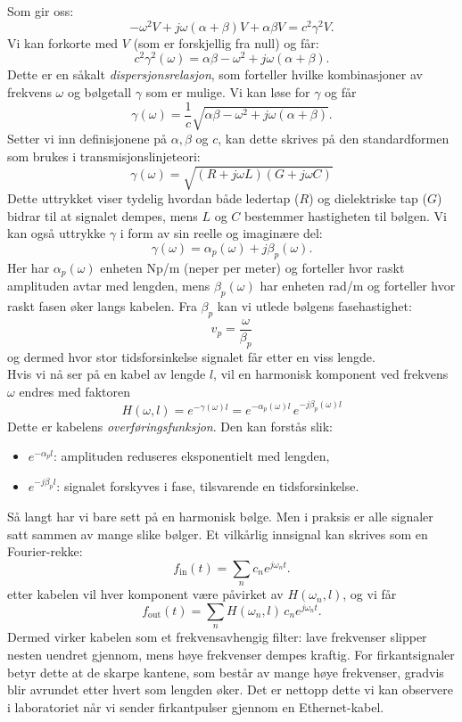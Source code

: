 Som gir oss:
\[    
-\omega^2 V + j\omega(\alpha+\beta)V + \alpha \beta V = c^2 \gamma^2 V.
\]
Vi kan forkorte med $V$ (som er forskjellig fra null) og får:
\[
c^2 \gamma^2(\omega) = \alpha \beta - \omega^2 + j\omega(\alpha+\beta).
\]
\clearpage
\noindent Dette er en såkalt \emph{dispersjonsrelasjon}, som forteller hvilke kombinasjoner av 
frekvens $\omega$ og bølgetall $\gamma$ som er mulige. Vi kan løse for $\gamma$ og får
\[
\gamma(\omega) = \frac{1}{c}\sqrt{\alpha\beta - \omega^2 + j\omega(\alpha+\beta)}.
\]
Setter vi inn definisjonene på $\alpha,\beta$ og $c$, kan dette skrives på den standardformen
som brukes i transmisjonslinjeteori:
\begin{equation}
\;\gamma(\omega) = \sqrt{(R+j\omega L)(G+j\omega C)}\;
\label{eq:prop-konstant}
\end{equation}
Dette uttrykket viser tydelig hvordan både ledertap ($R$) og dielektriske tap ($G$) bidrar 
til at signalet dempes, mens $L$ og $C$ bestemmer hastigheten til bølgen. Vi kan også uttrykke $\gamma$
i form av sin reelle og imaginære del:
\[
\gamma(\omega) = \alpha_p(\omega) + j\beta_p(\omega).
\]
Her har $\alpha_p(\omega)$ enheten Np/m (neper per meter) og forteller hvor raskt amplituden 
avtar med lengden, mens $\beta_p(\omega)$ har enheten rad/m og forteller hvor raskt fasen 
øker langs kabelen. Fra $\beta_p$ kan vi utlede bølgens fasehastighet:
\[v_p = \frac{\omega}{\beta_p}\]
og dermed hvor stor tidsforsinkelse signalet får etter en viss lengde.\\[1em]
Hvis vi nå ser på en kabel av lengde $l$, vil en harmonisk komponent ved frekvens $\omega$ 
endres med faktoren
\begin{equation}
H(\omega,l) = e^{-\gamma(\omega)l} = e^{-\alpha_p(\omega)l}\,e^{-j\beta_p(\omega)l}
\end{equation}
Dette er kabelens \emph{overføringsfunksjon}. 
Den kan forstås slik:
\begin{itemize}
    \item \textbf{$e^{-\alpha_p l}$}: amplituden reduseres eksponentielt med lengden, 
    \item \textbf{$e^{-j\beta_p l}$}: signalet forskyves i fase, tilsvarende en tidsforsinkelse.\\[1em]
\end{itemize}
Så langt har vi bare sett på en harmonisk bølge. Men i praksis er alle signaler satt sammen av mange slike bølger. 
Et vilkårlig innsignal kan skrives som en Fourier-rekke:
\[
f_{\text{in}}(t) = \sum_n c_n e^{j\omega_n t}.
\]
etter kabelen vil hver komponent være påvirket av $H(\omega_n,l)$, og vi får
\[
f_{\text{out}}(t) = \sum_n H(\omega_n,l)\,c_n e^{j\omega_n t}.
\]
Dermed virker kabelen som et frekvensavhengig filter: lave frekvenser slipper nesten uendret gjennom, 
mens høye frekvenser dempes kraftig. For firkantsignaler betyr dette at de skarpe kantene, 
som består av mange høye frekvenser, gradvis blir avrundet etter hvert som lengden øker. 
Det er nettopp dette vi kan observere i laboratoriet når vi sender firkantpulser gjennom en Ethernet-kabel.

